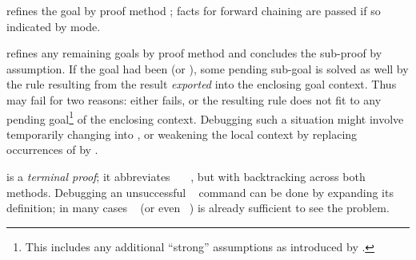 \begin{isabellebody}
\begin{isamarkuptext}
  \begin{descr}
  
  \item [\mbox{\isa{\isacommand{proof}}}~\isa{{\isachardoublequote}m\isactrlsub {\isadigit{1}}{\isachardoublequote}}] refines the goal by
  proof method ; facts for forward chaining are
  passed if so indicated by  mode.
  
  \item [\mbox{\isa{\isacommand{qed}}}~\isa{{\isachardoublequote}m\isactrlsub {\isadigit{2}}{\isachardoublequote}}] refines any remaining
  goals by proof method  and concludes the
  sub-proof by assumption.  If the goal had been  (or
  ), some pending sub-goal is solved as well by the rule
  resulting from the result \emph{exported} into the enclosing goal
  context.  Thus  may fail for two reasons: either  fails, or the resulting rule does not fit to any
  pending goal\footnote{This includes any additional ``strong''
  assumptions as introduced by \mbox{}.} of the enclosing
  context.  Debugging such a situation might involve temporarily
  changing \mbox{} into \mbox{}, or weakening the
  local context by replacing occurrences of \mbox{} by
  \mbox{}.
  
  \item [\mbox{\isa{\isacommand{by}}}~\isa{{\isachardoublequote}m\isactrlsub {\isadigit{1}}\ m\isactrlsub {\isadigit{2}}{\isachardoublequote}}] is a
  \emph{terminal proof}; it abbreviates
  \mbox{}~~~, but with backtracking across both methods.  Debugging
  an unsuccessful \mbox{}~
  command can be done by expanding its definition; in many cases
  \mbox{}~ (or even ~) is already sufficient to see the
  problem.


\end{descr}
\end{isamarkuptext}
\end{isabellebody}
